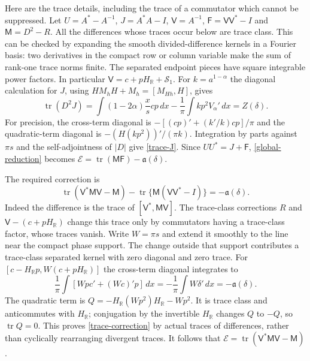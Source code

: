\documentclass[a4paper,11pt]{amsart}
\theoremstyle{remark}\newtheorem{remark}[theorem]{Remark}
\newcommand{\tr}{\operatorname{tr}}
\newcommand{\R}{\mathbb R}
\newcommand{\dd}{\,d}
\begin{document}
Here are the trace details, including the trace of a commutator
which cannot be suppressed. Let $U=A^*-A^{-1}$, $J=A^*A-I$,
$\mathsf V=A^{-1}$, $\mathsf F=\mathsf V\mathsf V^*-I$ and
$\mathsf M=D^2-R$. All the differences whose traces occur below
are trace class. This can be checked by expanding the smooth
divided-difference kernels in a Fourier basis: two derivatives in
the compact row or column variable make the sum of rank-one
trace norms finite. The separated endpoint pieces have square
integrable power factors. In particular
$\mathsf V=c+pH_{\R}+\mathcal S_1$.
For $k=a^{1-\alpha}$ the diagonal calculation for $J$, using
$HM_hH+M_h=[M_{Hh},H]$, gives
\begin{equation}\label{trace-J}
 \tr(D^2J)=\int(1-2\alpha)\frac{x}{s}cp\dd x
 -\frac1\pi\int k p^2V_\alpha'\dd x=Z(\delta).
\end{equation}
For precision, the cross-term diagonal is
$-[(cp)'+(k'/k)cp]/\pi$ and the quadratic-term diagonal is
$-(H(kp^2))'/(\pi k)$. Integration by parts against $\pi s$
and the self-adjointness of $|D|$ give \eqref{trace-J}.
Since $UU^*=J+\mathsf F$, \eqref{global-reduction} becomes
$\mathcal E=\tr(\mathsf M\mathsf F)-\mathfrak a(\delta)$.

The required correction is
\begin{equation}\label{trace-correction}
 \tr(\mathsf V^*\mathsf M\mathsf V-\mathsf M)
 -\tr\{\mathsf M(\mathsf V\mathsf V^*-I)\}
 =-\mathfrak a(\delta).
\end{equation}
Indeed the difference is the trace of
$[\mathsf V^*,\mathsf M\mathsf V]$.
The trace-class corrections $R$ and
$\mathsf V-(c+pH_{\R})$ change this trace only by commutators
having a trace-class factor, whose traces vanish.
Write $W=\pi s$ and extend it smoothly to the line near the compact
phase support. The change outside that support contributes a
trace-class separated kernel with zero diagonal and zero trace.
For $[c-H_{\R}p,W(c+pH_{\R})]$ the cross-term diagonal integrates to
\begin{equation*}
 \frac1\pi\int[Wp c'+(Wc)'p]\dd x
 =-\frac1\pi\int W\delta'\dd x=-\mathfrak a(\delta).
\end{equation*}
The quadratic term is
$Q=-H_{\R}(Wp^2)H_{\R}-Wp^2$.
It is trace class and anticommutes with $H_{\R}$; conjugation by
the invertible $H_{\R}$ changes $Q$ to $-Q$, so $\tr Q=0$.
This proves \eqref{trace-correction} by actual traces of
differences, rather than cyclically rearranging divergent traces.
It follows that
$\mathcal E=\tr(\mathsf V^*\mathsf M\mathsf V-\mathsf M)$.
\end{document}
